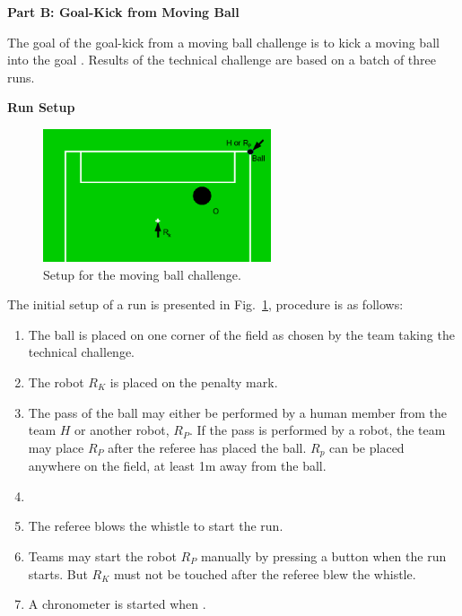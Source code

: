 \clearpage
\sffamily
{\bfseries\color[rgb]{0.4,0.4,0.4}
Part B: Goal-Kick from Moving Ball}
{}


\bigskip

The goal of the goal-kick from a moving ball challenge is to kick a moving ball
into the goal .
Results of the technical challenge are based on a batch of three runs.

\bigskip

{\bfseries Run Setup}

\smallskip

\begin{figure}[h]
\begin{center}
\includegraphics[width=0.6\textwidth]{img/tc_dynamic_kick.png}
\caption{\label{fig:tc_dynamic_kick}Setup for the moving ball challenge.}
\end{center}
\end{figure}

The initial setup of a run is presented in Fig.~\ref{fig:tc_dynamic_kick},
procedure is as follows:


\begin{enumerate}
\item The ball is placed on one corner of the field as chosen by the team taking the
technical challenge.
\item The robot $R_K$ is placed on the penalty mark.
\item The pass of the ball may either be performed by a human member from the
team $H$ or another robot, $R_P$. If the pass is performed by a robot, the team
may place $R_P$ after the referee has placed the ball. $R_p$ can be placed
anywhere on the field, at least 1m away from the ball.
\item {}
\item The referee blows the whistle to start the run.
\item Teams may start the robot $R_P$ manually by pressing a button when the
  run starts. But $R_K$ must not be touched after the referee blew the whistle.
\item A chronometer is started when 
  .
\end{enumerate}

